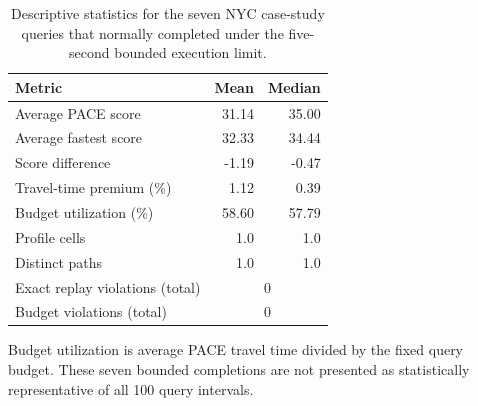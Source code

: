\begin{table}[t]
\centering
\caption{Descriptive statistics for the seven NYC case-study queries that normally completed under the five-second bounded execution limit.}
\label{tab:nyc-case-seven-queries}
\begin{tabular}{lrr}
\toprule
Metric & Mean & Median \\
\midrule
Average PACE score & 31.14 & 35.00 \\
Average fastest score & 32.33 & 34.44 \\
Score difference & -1.19 & -0.47 \\
Travel-time premium (\%) & 1.12 & 0.39 \\
Budget utilization (\%) & 58.60 & 57.79 \\
Profile cells & 1.0 & 1.0 \\
Distinct paths & 1.0 & 1.0 \\
\midrule
Exact replay violations (total) & \multicolumn{2}{c}{0} \\
Budget violations (total) & \multicolumn{2}{c}{0} \\
\bottomrule
\end{tabular}
\begin{minipage}{0.96\linewidth}
\footnotesize Budget utilization is average PACE travel time divided by the fixed query budget. These seven bounded completions are not presented as statistically representative of all 100 query intervals.
\end{minipage}
\end{table}
